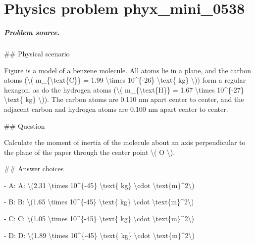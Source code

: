 
\chapter{Physics problem phyx\_mini\_0538}
\label{ch:PhyXMiniProblems_problem_phyx_mini_0538}

\paragraph{Problem source.}
\#\# Physical scenario

Figure is a model of a benzene molecule. All atoms lie in a plane, and the carbon atoms (\textbackslash{}( m\_\{\textbackslash{}text\{C\}\} = 1.99 \textbackslash{}times 10\textasciicircum{}\{-26\} \textbackslash{}text\{ kg\} \textbackslash{})) form a regular hexagon, as do the hydrogen atoms (\textbackslash{}( m\_\{\textbackslash{}text\{H\}\} = 1.67 \textbackslash{}times 10\textasciicircum{}\{-27\} \textbackslash{}text\{ kg\} \textbackslash{})). The carbon atoms are 0.110 nm apart center to center, and the adjacent carbon and hydrogen atoms are 0.100 nm apart center to center.

\#\# Question

Calculate the moment of inertia of the molecule about an axis perpendicular to the plane of the paper through the center point \textbackslash{}( O \textbackslash{}).

\#\# Answer choices

- A: A: \textbackslash{}(2.31 \textbackslash{}times 10\textasciicircum{}\{-45\} \textbackslash{}text\{ kg\} \textbackslash{}cdot \textbackslash{}text\{m\}\textasciicircum{}2\textbackslash{})

- B: B: \textbackslash{}(1.65 \textbackslash{}times 10\textasciicircum{}\{-45\} \textbackslash{}text\{ kg\} \textbackslash{}cdot \textbackslash{}text\{m\}\textasciicircum{}2\textbackslash{})

- C: C: \textbackslash{}(1.05 \textbackslash{}times 10\textasciicircum{}\{-45\} \textbackslash{}text\{ kg\} \textbackslash{}cdot \textbackslash{}text\{m\}\textasciicircum{}2\textbackslash{})

- D: D: \textbackslash{}(1.89 \textbackslash{}times 10\textasciicircum{}\{-45\} \textbackslash{}text\{ kg\} \textbackslash{}cdot \textbackslash{}text\{m\}\textasciicircum{}2\textbackslash{})

